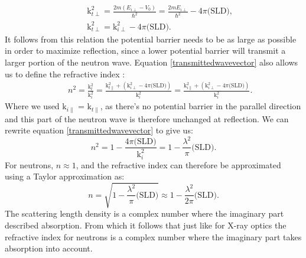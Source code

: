 \begin{eqnarray}\label{transmitted_wave_number}
	&&\textrm{k}^2_{t\perp} = \frac{2m(E_{i\perp}-V_0)}{\hbar^2} = \frac{2mE_{i\perp}}{\hbar^2}-4\pi \textrm{(SLD)}, \\ 
	&&\textrm{k}^2_{t\perp} = \textrm{k}^2_{i\perp} - 4\pi \textrm{(SLD)}. \label{transmittedwavevector}
\end{eqnarray}
It follows from this relation the potential barrier needs to be as large as possible in order to maximize reflection, since a lower potential barrier will transmit a larger portion of the neutron wave. Equation \ref{transmittedwavevector} also allows us to define the refractive index \cite{refractive_index}:
\begin{eqnarray}
	&&n^2 = \frac{\textrm{k}^2_{t}}{\textrm{k}^2_{i}} = \frac{\textrm{k}^2_{t \parallel} + (\textrm{k}^2_{i\perp} - 4\pi \textrm{(SLD)})}{\textrm{k}^2_{i}} = \frac{\textrm{k}^2_{i \parallel} + (\textrm{k}^2_{i\perp} - 4\pi \textrm{(SLD)})}{\textrm{k}^2_{i}}.
\end{eqnarray}
Where we used $\textrm{k}_{i \parallel}$ = $\textrm{k}_{t \parallel}$, as there's no potential barrier in the parallel direction and this part of the neutron wave is therefore unchanged at reflection. We can rewrite equation \ref{transmittedwavevector} to give us:
\begin{equation}\label{refractive_index_squared}
	n^2 = 1 - \frac{4\pi \textrm{(SLD)}}{\textrm{k}^2_{i}} = 1 - \frac{\lambda^2}{\pi} \textrm{(SLD)}.
\end{equation}
For neutrons, $n \approx 1$, and the refractive index can therefore be approximated using a Taylor approximation as:
\begin{equation}\label{refractiveindexapprox}
	n = \sqrt{1 - \frac{\lambda^2}{\pi} \textrm{(SLD)}} \approx  1 -\frac{\lambda^2}{2\pi} \textrm{(SLD)}.
\end{equation}
The scattering length density is a complex number where the imaginary part described absorption. From which it follows that just like for X-ray optics the refractive index for neutrons is a complex number where the imaginary part takes absorption into account.
